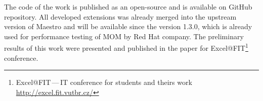 The code of the work is published as an open-source and is available on GitHub repository. All developed extensions was already merged into the upstream version of Maestro and will be available since the version 1.3.0, which is already used for performance testing of MOM by Red Hat company. The preliminary results of this work were presented and published in the paper for Excel@FIT\footnote{Excel@FIT\,---\,IT conference for students and theirs work \url{http://excel.fit.vutbr.cz/}} conference.



